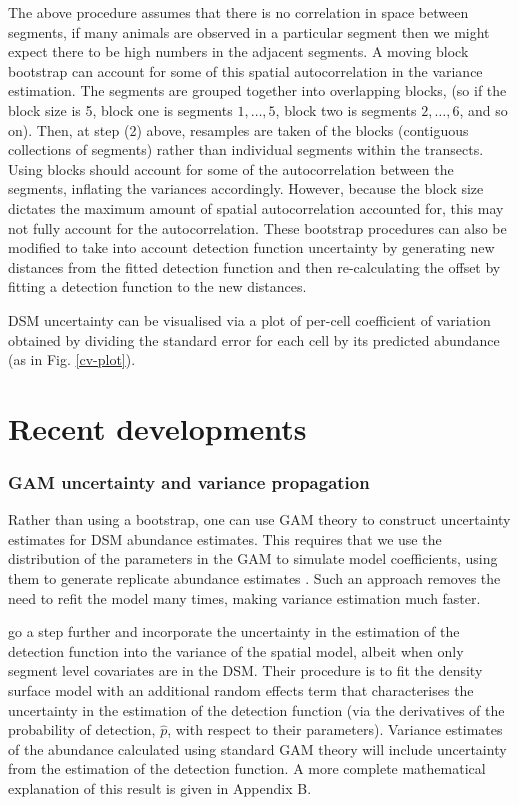 \documentclass[a4paper,12pt]{article}
\begin{document}
The above procedure assumes that there is no correlation in space between segments, if many animals are observed in a particular segment then we might expect there to be high numbers in the adjacent segments. A moving block bootstrap \citep[MBB;][Section 8.6]{Efron:1993tv} can account for some of this spatial autocorrelation in the variance estimation. The segments are grouped together into overlapping blocks, (so if the block size is 5, block one is segments $1,\ldots,5$, block two is segments $2,\ldots,6$, and so on). Then, at step (2) above, resamples are taken of the blocks (contiguous collections of segments) rather than individual segments within the transects. Using blocks should account for some of the autocorrelation between the segments, inflating the variances accordingly. However, because the block size dictates the maximum amount of spatial autocorrelation accounted for, this may not fully account for the autocorrelation. These bootstrap procedures can also be modified to take into account detection function uncertainty by generating new distances from the fitted detection function and then re-calculating the offset by fitting a detection function to the new distances.
 
DSM uncertainty can be visualised via a plot of per-cell coefficient of variation obtained by dividing the standard error for each cell by its predicted abundance (as in Fig. \ref{cv-plot}). 

\section*{Recent developments}
\label{s:recentadvances}

\subsubsection*{GAM uncertainty and variance propagation}

Rather than using a bootstrap, one can use GAM theory to construct uncertainty estimates for DSM abundance estimates. This requires that we use the distribution of the parameters in the GAM to simulate model coefficients, using them to generate replicate abundance estimates \citep[further information can found in][page 245]{Wood:2006wz}. Such an approach removes the need to refit the model many times, making variance estimation much faster.
 
\cite{WILLIAMS:2011in} go a step further and incorporate the uncertainty in the estimation of the detection function into the variance of the spatial model, albeit when only segment level covariates are in the DSM. Their procedure is to fit the density surface model with an additional random effects term that characterises the uncertainty in the estimation of the detection function (via the derivatives of the probability of detection, $\hat{p}$, with respect to their parameters). Variance estimates of the abundance calculated using standard GAM theory will include uncertainty from the estimation of the detection function. A more complete mathematical explanation of this result is given in Appendix B.
\end{document}
